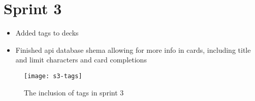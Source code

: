 \section{Sprint 3}

\begin{itemize}
\item Added tags to decks
\item Finished api database shema allowing for more info in cards, including title and limit characters and card completions
\end{itemize}

 \begin{figure}
\texttt{[image: s3-tags]}
\caption{The inclusion of tags in sprint 3}
\centering
\end{figure}
